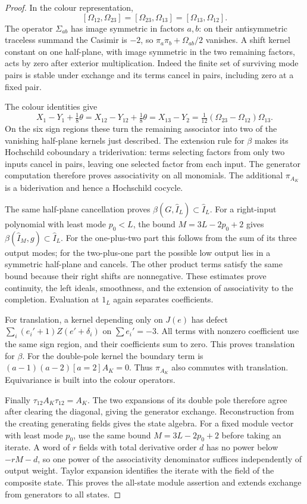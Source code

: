 \begin{proof}
In the colour representation,
\[
 [\Omega_{12},\Omega_{23}]
 =[\Omega_{23},\Omega_{13}]=[\Omega_{13},\Omega_{12}].
\]
The operator $\Sigma_{ab}$ has image symmetric in factors $a,b$:
on their antisymmetric traceless summand the Casimir is $-2$, so
$\pi_a\pi_b+\Omega_{ab}/2$ vanishes.  A shift kernel constant on
one half-plane, with image symmetric in the two remaining factors,
acts by zero after exterior multiplication.  Indeed the finite set
of surviving mode pairs is stable under exchange and its terms cancel
in pairs, including zero at a fixed pair.

The colour identities give
\[
 X_1-Y_1+\tfrac18\theta
 =X_{12}-Y_{12}+\tfrac18\theta
 =X_{13}-Y_2=\tfrac1{12}(\Omega_{23}-\Omega_{12})\Omega_{13}.
\]
On the six sign regions these turn the remaining associator into two
of the vanishing half-plane kernels just described.  The extension
rule for $\beta$ makes its Hochschild coboundary a triderivation:
terms selecting factors from only two inputs cancel in pairs, leaving
one selected factor from each input.  The generator computation
therefore proves associativity on all monomials.  The additional
$\pi_{A_K}$ is a biderivation and hence a Hochschild cocycle.

The same half-plane cancellation proves
$\beta(G,\widehat I_L)\subset\widehat I_L$.
For a right-input polynomial with least mode $p_0<L$, the bound
$M=3L-2p_0+2$ gives
$\beta(\widehat I_M,g)\subset\widehat I_L$.
For the one-plus-two part this follows from the sum of its three
output modes; for the two-plus-one part the possible low output lies
in a symmetric half-plane and cancels.  The other product terms
satisfy the same bound because their right shifts are nonnegative.
These estimates prove continuity, the left ideals, smoothness, and
the extension of associativity to the completion.  Evaluation at $1_L$
again separates coefficients.

For translation, a kernel depending only on $J(e)$ has defect
$\sum_i(e_i'+1)Z(e'+\delta_i)$ on $\sum e_i'=-3$.
All terms with nonzero coefficient use the same sign region, and
their coefficients sum to zero.  This proves translation for $\beta$.
For the double-pole kernel the boundary term is
$(a-1)(a-2)[a=2]A_K=0$.  Thus $\pi_{A_K}$ also commutes with
translation.  Equivariance is built into the colour operators.

Finally $\tau_{12}A_K\tau_{12}=A_K$.  The two expansions of its
double pole therefore agree after clearing the diagonal, giving the
generator exchange.  Reconstruction from the creating generating
fields gives the state algebra.  For a fixed module vector with least
mode $p_0$, use the same bound $M=3L-2p_0+2$ before taking an
iterate.  A word of $r$ fields with total derivative order $d$ has
no power below $-rM-d$, so one power of the associativity denominator
suffices independently of output weight.  Taylor expansion identifies
the iterate with the field of the composite state.  This proves the
all-state module assertion and extends exchange from generators to
all states.
\end{proof}

